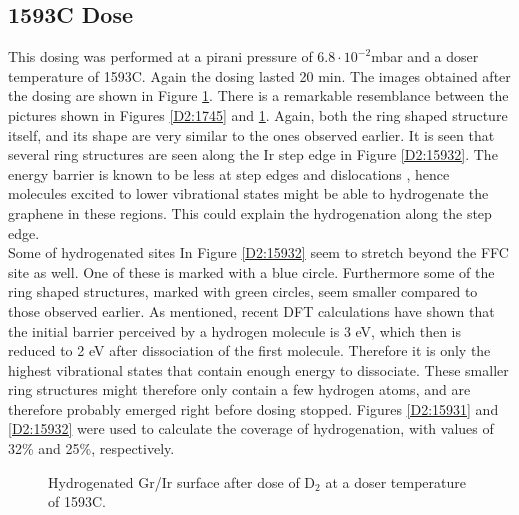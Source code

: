 \subsection{1593\degree C Dose}

This dosing was performed at a pirani pressure of $6.8 \cdot 10^{-2}$mbar and a doser temperature of 1593\degree C. Again the dosing lasted 20 min. The images obtained after the dosing are shown in Figure \ref{D2:1593}. There is a remarkable resemblance between the pictures shown in Figures \ref{D2:1745} and \ref{D2:1593}. Again, both the ring shaped structure itself, and its shape are very similar to the ones observed earlier. It is seen that several ring structures are seen along the Ir step edge in Figure \ref{D2:15932}. The energy barrier is known to be less at step edges and dislocations \cite{Lineunpublished}, hence molecules excited to lower vibrational states might be able to hydrogenate the graphene in these regions. This could explain the hydrogenation along the step edge.\\
Some of hydrogenated sites In Figure \ref{D2:15932} seem to stretch beyond the FFC site as well. One of these is marked with a blue circle. Furthermore some of the ring shaped structures, marked with green circles, seem smaller compared to those observed earlier. As mentioned, recent DFT calculations have shown that the initial barrier perceived by a hydrogen molecule is 3 eV, which then is reduced to 2 eV after dissociation of the first molecule.\cite{Lineunpublished} Therefore it is only the highest vibrational states that contain enough energy to dissociate. These smaller ring structures might therefore only contain a few hydrogen atoms, and are therefore probably emerged right before dosing stopped.
Figures \ref{D2:15931} and \ref{D2:15932} were used to calculate the coverage of hydrogenation, with values of 32\% and 25\%, respectively.

\begin{figure}[H]
\caption{Hydrogenated Gr/Ir surface after dose of D$_2$ at a doser temperature of 1593\degree C.}
\label{D2:1593}
\end{figure}

